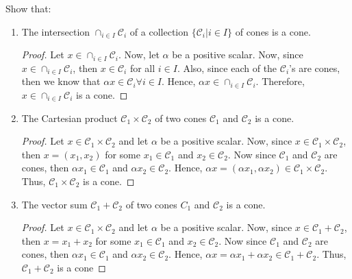 \begin{prob}[1.4]Show that:
\end{prob}  
  \begin{enumerate}[label=(\alph*)]
  \item{The intersection $\cap_{i \in I}\mathcal{C}_{i}$ of a collection $\{\mathcal{C}_{i} | i \in I\}$ of cones is a cone.
    \begin{proof}
      Let $x \in \cap_{i \in I}\mathcal{C}_{i}$. Now, let $\alpha$ be a positive
      scalar.  Now, since $x \in \cap_{i \in I}\mathcal{C}_{i}$, then
      $x \in \mathcal{C}_{i}$ for all $i \in I$. Also, since each of the
      $\mathcal{C}_{i}$'s are cones, then we know that
      $\alpha x \in \mathcal{C}_{i} \forall i \in I$. Hence,
      $\alpha x \in \cap_{i \in I}\mathcal{C}_{i}$. Therefore,
      $x \in \cap_{i \in I}\mathcal{C}_{i}$ is a cone.
    \end{proof}}
  \item{The Cartesian product $\mathcal{C}_{1} \times \mathcal{C}_{2}$ of two
    cones $\mathcal{C}_{1}$ and $\mathcal{C}_{2}$ is a cone.
    \begin{proof}
      Let $x \in \mathcal{C}_{1} \times  \mathcal{C}_{2}$ and let $\alpha$ be
      a positive scalar. Now, since
      $x \in \mathcal{C}_{1} \times  \mathcal{C}_{2}$, then $x = (x_{1},x_{2})$
      for some $x_{1} \in \mathcal{C}_{1}$ and $x_{2} \in \mathcal{C}_{2}$. Now
      since $\mathcal{C}_{1}$ and $\mathcal{C}_{2}$ are cones, then
      $\alpha x_{1} \in \mathcal{C}_{1}$ and $\alpha x_{2} \in \mathcal{C}_{2}$.
      Hence, $\alpha x = (\alpha x_{1}, \alpha x_{2}) \in \mathcal{C}_{1} \times \mathcal{C}_{2}$. Thus, $\mathcal{C}_{1} \times \mathcal{C}_{2}$ is a cone.
    \end{proof}}    
  \item{The vector sum $\mathcal{C}_{1} + \mathcal{C}_{2}$ of two cones
    $C_{1}$ and $\mathcal{C}_{2}$ is a cone.
    \begin{proof}
      Let $x \in \mathcal{C}_{1} \times  \mathcal{C}_{2}$ and let $\alpha$ be
      a positive scalar. Now, since
      $x \in \mathcal{C}_{1} + \mathcal{C}_{2}$, then $x = x_{1} + x_{2}$
      for some $x_{1} \in \mathcal{C}_{1}$ and $x_{2} \in \mathcal{C}_{2}$. Now
      since $\mathcal{C}_{1}$ and $\mathcal{C}_{2}$ are cones, then
      $\alpha x_{1} \in \mathcal{C}_{1}$ and $\alpha x_{2} \in \mathcal{C}_{2}$.
      Hence, $\alpha x = \alpha x_{1} + \alpha x_{2} \in \mathcal{C}_{1} + \mathcal{C}_{2}$. Thus, $\mathcal{C}_{1} + \mathcal{C}_{2}$ is a cone
    \end{proof}}    

\end{enumerate}
